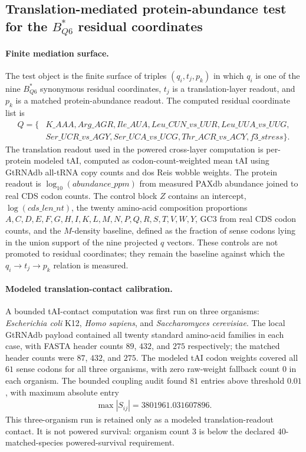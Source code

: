 \subsection{Translation-mediated protein-abundance test for the $B^{\ast}_{Q6}$ residual coordinates}
\label{sec:q6-translation-mediated-protein-abundance-cross-layer}

\paragraph{Finite mediation surface.}
The test object is the finite surface of triples $(q_i,t_j,p_k)$ in which $q_i$ is one of the nine $B^{\ast}_{Q6}$ synonymous residual coordinates, $t_j$ is a translation-layer readout, and $p_k$ is a matched protein-abundance readout.  The computed residual coordinate list is
$$
\begin{aligned}
Q = \{&K\_AAA, Arg\_AGR, Ile\_AUA, Leu\_CUN\_vs\_UUR, Leu\_UUA\_vs\_UUG,\\
&Ser\_UCR\_vs\_AGY, Ser\_UCA\_vs\_UCG, Thr\_ACR\_vs\_ACY, f3\_stress\}.
\end{aligned}
$$
The translation readout used in the powered cross-layer computation is per-protein modeled tAI, computed as codon-count-weighted mean tAI using GtRNAdb all-tRNA copy counts and dos Reis wobble weights.  The protein readout is $\log_{10}(abundance\_ppm)$ from measured PAXdb abundance joined to real CDS codon counts.  The control block $Z$ contains an intercept, $\log(cds\_len\_nt)$, the twenty amino-acid composition proportions $A,C,D,E,F,G,H,I,K,L,M,N,P,Q,R,S,T,V,W,Y$, GC3 from real CDS codon counts, and the $M$-density baseline, defined as the fraction of sense codons lying in the union support of the nine projected $q$ vectors.  These controls are not promoted to residual coordinates; they remain the baseline against which the $q_i \to t_j \to p_k$ relation is measured.

\paragraph{Modeled translation-contact calibration.}
A bounded tAI-contact computation was first run on three organisms: \emph{Escherichia coli} K12, \emph{Homo sapiens}, and \emph{Saccharomyces cerevisiae}.  The local GtRNAdb payload contained all twenty standard amino-acid families in each case, with FASTA header counts $89$, $432$, and $275$ respectively; the matched header counts were $87$, $432$, and $275$.  The modeled tAI codon weights covered all $61$ sense codons for all three organisms, with zero raw-weight fallback count $0$ in each organism.  The bounded coupling audit found $81$ entries above threshold $0.01$, with maximum absolute entry
$$
\begin{aligned}
\max |S_{ij}| = 3801961.031607896.
\end{aligned}
$$
This three-organism run is retained only as a modeled translation-readout contact.  It is not powered survival: organism count $3$ is below the declared $40$-matched-species powered-survival requirement.

